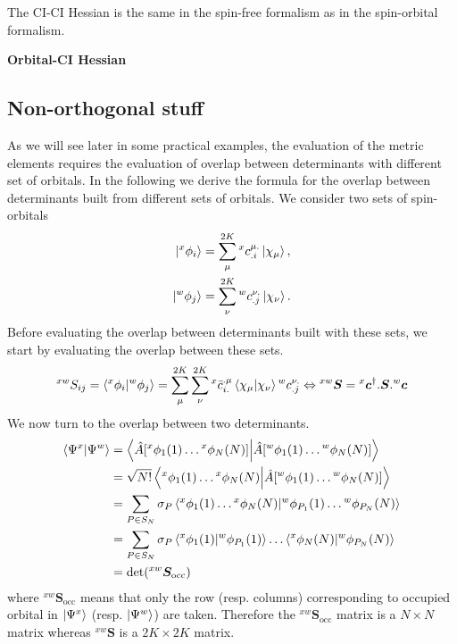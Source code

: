 \documentclass[11pt,a4paper]{article}
\newcommand{\hA}{\Hat{A}}
\begin{document}
The CI-CI Hessian is the same in the spin-free formalism as in the spin-orbital formalism.

\noindent\textbf{Orbital-CI Hessian}


\subsection{Non-orthogonal stuff}

As we will see later in some practical examples, the evaluation of the metric elements requires the evaluation of overlap between determinants with different set of orbitals.
In the following we derive the formula for the overlap between determinants built from different sets of orbitals.
We consider two sets of spin-orbitals
\begin{align}
  \ket{{}^{x}\phi_i} &= \sum^{2K}_\mu {}^{x}c_{.i}^{\mu .}\ket{\chi_\mu}, \\
  \ket{{}^{w}\phi_j} &= \sum^{2K}_\nu {}^{w}c_{.j}^{\nu .}\ket{\chi_\nu}.
\end{align}
Before evaluating the overlap between determinants built with these sets, we start by evaluating the overlap between these sets.
\begin{equation}
  \label{eq:NonOrtho_Overlap}
  ^{xw}S_{ij} = \braket{{}^{x}\phi_i}{{}^{w}\phi_j} = \sum^{2K}_\mu\sum^{2K}_\nu {}^{x}\bar{c}_{i.}^{.\mu}\braket{\chi_\mu}{\chi_\nu} {}^{w}c_{.j}^{\nu .} \Leftrightarrow {}^{xw}\bm{S} =  {}^{x}\bm{c}^\dagger.\bm{S}.{}^{w}\bm{c}
\end{equation}
We now turn to the overlap between two determinants.
\begin{subequations}
  \begin{align}
    \braket{\Psi^x}{\Psi^w} &= \braket{\hA\mleft[{}^x\phi_1(1)\dots{}^x\phi_N(N)\mright]}{\hA\mleft[{}^w\phi_1(1)\dots{}^w\phi_N(N)\mright]} \\
                            &= \sqrt{N!} \braket{{}^x\phi_1(1)\dots{}^x\phi_N(N)}{\hA\mleft[{}^w\phi_1(1)\dots{}^w\phi_N(N)\mright]} \\
                            &= \sum_{P\in S_N}\sigma_P \braket{{}^x\phi_1(1)\dots{}^x\phi_N(N)}{{}^w\phi_{P_1}(1)\dots{}^w\phi_{P_N}(N)} \\
                            &= \sum_{P\in S_N}\sigma_P   \braket{{}^x\phi_1(1)}{{}^w\phi_{P_1}(1)}\dots\braket{{}^x\phi_N(N)}{{}^w\phi_{P_N}(N)} \\
    &= \det({}^{xw}\bm{S}_{\text{occ}})
  \end{align}
\end{subequations}
where ${}^{xw}\bm{S}_{\text{occ}}$ means that only the row (resp. columns) corresponding to occupied orbital in $\ket{\Psi^x}$ (resp. $\ket{\Psi^w}$) are taken. Therefore the ${}^{xw}\bm{S}_{\text{occ}}$ matrix is a $N\times N$ matrix whereas ${}^{xw}\bm{S}$ is a $2K\times 2K$ matrix.
\end{document}
